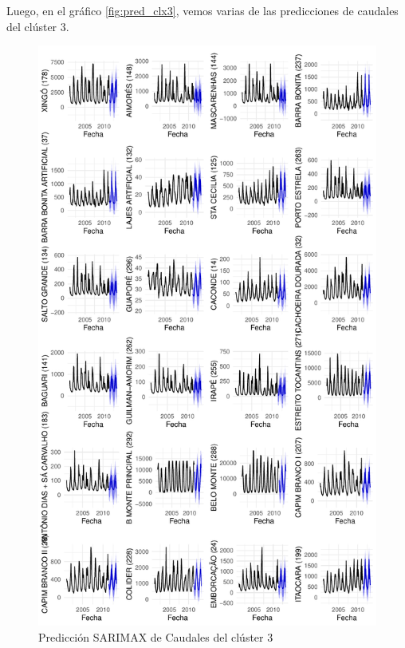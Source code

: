 \documentclass[12pt,oneside]{book}\usepackage[]{graphicx}\usepackage[]{color}
\makeatletter
\def\maxwidth{ %
  \ifdim\Gin@nat@width>\linewidth
    \linewidth
  \else
    \Gin@nat@width
  \fi
}
\newenvironment{knitrout}{}{} %
\theoremstyle{definition} %
\makeatother
\begin{document}
Luego, en el gráfico \ref{fig:pred_clx3}, vemos varias de las predicciones de caudales del clúster 3.

\begin{knitrout}
\color{fgcolor}\begin{figure}[h]

{\centering \includegraphics[width=\maxwidth,height=0.85\textheight]{figure/unnamed-chunk-111-1} 

}

\caption{\label{fig:pred_clx3} Predicción SARIMAX de Caudales del clúster 3}\label{fig:unnamed-chunk-111}
\end{figure}


\end{knitrout}
\end{document}
